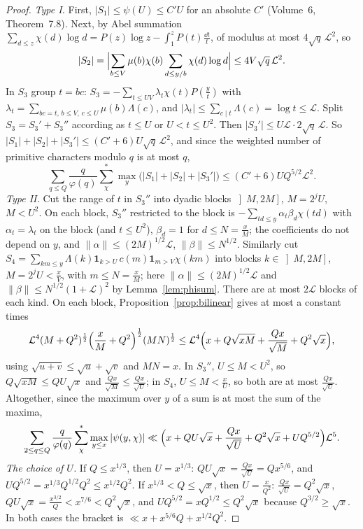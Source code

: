 \begin{proof}
\emph{Type I.} First, $|S_1|\le\psi(U)\le C'U$ for an absolute $C'$ (Volume~6, Theorem~7.8). Next, by Abel summation $\sum_{d\le z}\chi(d)\log d=P(z)\log z-\int_1^zP(t)\frac{\dd t}t$, of modulus at most $4\sqrt q\,\mathcal L^2$, so
\[
|S_2|=\Bigl|\sum_{b\le V}\mu(b)\chi(b)\sum_{d\le y/b}\chi(d)\log d\Bigr|\le4V\sqrt q\,\mathcal L^2.
\]
In $S_3$ group $t=bc$: $S_3=-\sum_{t\le UV}\lambda_t\chi(t)P(\frac yt)$ with $\lambda_t=\sum_{bc=t,\,b\le V,\,c\le U}\mu(b)\Lambda(c)$, and $|\lambda_t|\le\sum_{c\mid t}\Lambda(c)=\log t\le\mathcal L$. Split $S_3=S_3'+S_3''$ according as $t\le U$ or $U<t\le U^2$. Then $|S_3'|\le U\mathcal L\cdot2\sqrt q\,\mathcal L$. So $|S_1|+|S_2|+|S_3'|\le(C'+6)U\sqrt q\,\mathcal L^2$, and since the weighted number of primitive characters modulo $q$ is at most $q$,
\[
\sum_{q\le Q}\frac q{\varphi(q)}\sum^*_\chi\max_y\bigl(|S_1|+|S_2|+|S_3'|\bigr)\le(C'+6)UQ^{5/2}\mathcal L^2.
\]
\emph{Type II.} Cut the range of $t$ in $S_3''$ into dyadic blocks $\left]M,2M\right]$, $M=2^jU$, $M<U^2$. On each block, $S_3''$ restricted to the block is $-\sum_{td\le y}\alpha_t\beta_d\chi(td)$ with $\alpha_t=\lambda_t$ on the block (and $t\le U^2$), $\beta_d=1$ for $d\le N=\frac xM$; the coefficients do not depend on $y$, and $\|\alpha\|\le(2M)^{1/2}\mathcal L$, $\|\beta\|\le N^{1/2}$. Similarly cut $S_4=\sum_{km\le y}\Lambda(k)\mathbf 1_{k>U}\,c(m)\mathbf 1_{m>V}\chi(km)$ into blocks $k\in\left]M,2M\right]$, $M=2^jU<\frac xV$, with $m\le N=\frac xM$; here $\|\alpha\|\le(2M)^{1/2}\mathcal L$ and $\|\beta\|\le N^{1/2}(1+\mathcal L)^2$ by Lemma~\ref{lem:phisum}. There are at most $2\mathcal L$ blocks of each kind. On each block, Proposition~\ref{prop:bilinear} gives at most a constant times
\[
\mathcal L^4(M+Q^2)^{\frac12}\Bigl(\frac xM+Q^2\Bigr)^{\frac12}(MN)^{\frac12}\le\mathcal L^4\Bigl(x+Q\sqrt{xM}+\frac{Qx}{\sqrt M}+Q^2\sqrt x\Bigr),
\]
using $\sqrt{u+v}\le\sqrt u+\sqrt v$ and $MN=x$. In $S_3''$, $U\le M<U^2$, so $Q\sqrt{xM}\le QU\sqrt x$ and $\frac{Qx}{\sqrt M}\le\frac{Qx}{\sqrt U}$; in $S_4$, $U\le M<\frac xU$, so both are at most $\frac{Qx}{\sqrt U}$. Altogether, since the maximum over $y$ of a sum is at most the sum of the maxima,
\[
\sum_{2\le q\le Q}\frac q{\varphi(q)}\sum^*_\chi\max_{y\le x}|\psi(y,\chi)|\ll\Bigl(x+QU\sqrt x+\frac{Qx}{\sqrt U}+Q^2\sqrt x+UQ^{5/2}\Bigr)\mathcal L^5.
\]
\emph{The choice of $U$.} If $Q\le x^{1/3}$, then $U=x^{1/3}$: $QU\sqrt x=\frac{Qx}{\sqrt U}=Qx^{5/6}$, and $UQ^{5/2}=x^{1/3}Q^{1/2}Q^2\le x^{1/2}Q^2$. If $x^{1/3}<Q\le\sqrt x$, then $U=\frac x{Q^2}$: $\frac{Qx}{\sqrt U}=Q^2\sqrt x$, $QU\sqrt x=\frac{x^{3/2}}Q<x^{7/6}<Q^2\sqrt x$, and $UQ^{5/2}=xQ^{1/2}\le Q^2\sqrt x$ because $Q^{3/2}\ge\sqrt x$. In both cases the bracket is $\ll x+x^{5/6}Q+x^{1/2}Q^2$.
\end{proof}


